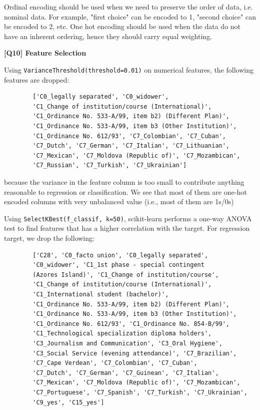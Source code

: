 \documentclass{article}
\begin{document}
\begin{description}
		Ordinal encoding should be used when we need to preserve the order of data, i.e. nominal data. For example, "first choice" can be encoded to 1, "second choice" can be encoded to 2, etc. One hot encoding should be used when the data do not have an inherent ordering, hence they should carry equal weighting.

	\item \textbf{[Q10] Feature Selection}

	Using \texttt{VarianceThreshold(threshold=0.01)} on numerical features, the following features are dropped:
	\begin{verbatim}
		['C0_legally separated', 'C0_widower',
		'C1_Change of institution/course (International)',
		'C1_Ordinance No. 533-A/99, item b2) (Different Plan)',
		'C1_Ordinance No. 533-A/99, item b3 (Other Institution)',
		'C1_Ordinance No. 612/93', 'C7_Colombian', 'C7_Cuban', 
		'C7_Dutch', 'C7_German', 'C7_Italian', 'C7_Lithuanian', 
		'C7_Mexican', 'C7_Moldova (Republic of)', 'C7_Mozambican', 
		'C7_Russian', 'C7_Turkish', 'C7_Ukrainian']
	\end{verbatim}
	because the variance in the feature column is too small to contribute anything reasonable to regression or classification. We see that most of them are one-hot encoded columns with very unbalanced value (i.e., most of them are 1s/0s)

	Using \texttt{SelectKBest(f\_classif, k=50)}, scikit-learn performs a one-way ANOVA test to find features that has a higher correlation with the target. For regression target, we drop the following:

	\begin{verbatim}
		['C28', 'C0_facto union', 'C0_legally separated', 
		'C0_widower', 'C1_1st phase - special contingent 
		(Azores Island)', 'C1_Change of institution/course',
		'C1_Change of institution/course (International)',
		'C1_International student (bachelor)',
		'C1_Ordinance No. 533-A/99, item b2) (Different Plan)',
		'C1_Ordinance No. 533-A/99, item b3 (Other Institution)',
		'C1_Ordinance No. 612/93', 'C1_Ordinance No. 854-B/99',
		'C1_Technological specialization diploma holders',
		'C3_Journalism and Communication', 'C3_Oral Hygiene',
		'C3_Social Service (evening attendance)', 'C7_Brazilian',
		'C7_Cape Verdean', 'C7_Colombian', 'C7_Cuban', 
		'C7_Dutch', 'C7_German', 'C7_Guinean', 'C7_Italian', 
		'C7_Mexican', 'C7_Moldova (Republic of)', 'C7_Mozambican', 
		'C7_Portuguese', 'C7_Spanish', 'C7_Turkish', 'C7_Ukrainian', 
		'C9_yes', 'C15_yes']
	\end{verbatim}


\end{description}
\end{document}
